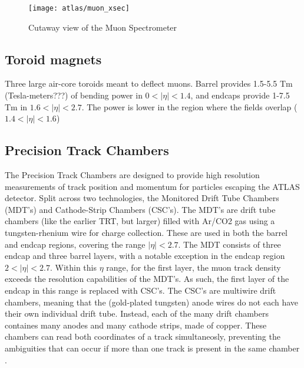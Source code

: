     \begin{figure}
        \texttt{[image: atlas/muon\_xsec]}
        \caption{Cutaway view of the Muon Spectrometer \cite{atlas_tdr}}
        \label{fig:muon_xsec}
    \end{figure}

    \subsection{Toroid magnets}
        Three large air-core toroids meant to deflect muons.
        Barrel provides 1.5-5.5 Tm (Tesla-meters???) of bending power in $0<|\eta|<1.4$,
        and endcaps provide 1-7.5 Tm in $1.6<|\eta|<2.7$.
        The power is lower in the region where the fields overlap ($1.4<|\eta|<1.6$)

    \subsection{Precision Track Chambers}
        The Precision Track Chambers are designed to provide high resolution measurements of track position and momentum for particles escaping the ATLAS detector. Split across two technologies, the Monitored Drift Tube Chambers (MDT's) and Cathode-Strip Chambers (CSC's).
        The MDT's are drift tube chambers (like the earlier TRT, but larger) filled with Ar/CO2 gas using a tungsten-rhenium wire for charge collection. These are used in both the barrel and endcap regions, covering the range $|\eta| < 2.7$.
        The MDT consists of three endcap and three barrel layers, with a notable exception in the endcap region $2 < |\eta| < 2.7$.
        Within this $\eta$ range, for the first layer, the muon track density exceeds the resolution capabilities of the MDT's.
        As such, the first layer of the endcap in this range is replaced with CSC's.
        The CSC's are multiwire drift chambers, meaning that the (gold-plated tungsten) anode wires do not each have their own individual drift tube.
        Instead, each of the many drift chambers containes many anodes and many cathode strips, made of copper.
        These chambers can read both coordinates of a track simultaneosly, preventing the ambiguities that can occur if more than one track is present in the same chamber \cite{atlas_tdr}.

